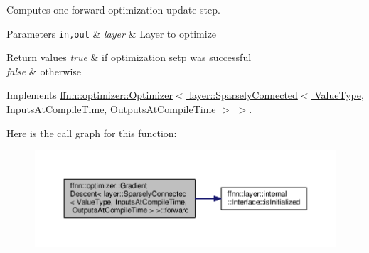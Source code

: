 Computes one forward optimization update step. 


\begin{DoxyParams}[1]{Parameters}
\mbox{\tt in,out}  & {\em layer} & Layer to optimize \\
\hline
\end{DoxyParams}

\begin{DoxyRetVals}{Return values}
{\em true} & if optimization setp was successful \\
\hline
{\em false} & otherwise \\
\hline
\end{DoxyRetVals}


Implements \hyperlink{classffnn_1_1optimizer_1_1_optimizer_a80505cfdeba0a3c8d1db19a2821613f2}{ffnn\-::optimizer\-::\-Optimizer$<$ layer\-::\-Sparsely\-Connected$<$ Value\-Type, Inputs\-At\-Compile\-Time, Outputs\-At\-Compile\-Time $>$ $>$}.



Here is the call graph for this function\-:\nopagebreak
\begin{figure}[H]
\begin{center}
\leavevmode
\includegraphics[width=350pt]{classffnn_1_1optimizer_1_1_gradient_descent_3_01layer_1_1_sparsely_connected_3_01_value_type_00_e6c27913ab0d90f52f73031aa88c19bf_a7e9882cd69c5d4ee64f5614614e9d96c_cgraph}
\end{center}
\end{figure}


